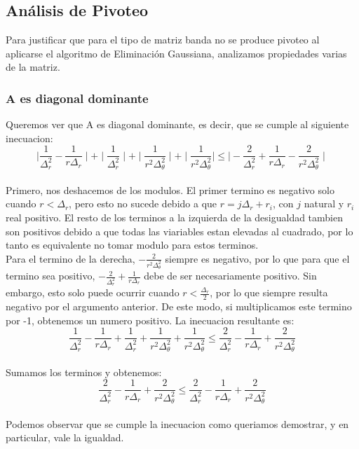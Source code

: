 \subsection{Análisis de Pivoteo}

Para justificar que para el tipo de matriz banda no se produce pivoteo al aplicarse el algoritmo de Eliminación Gaussiana, analizamos propiedades varias de la matriz.


\subsubsection{A es diagonal dominante}
Queremos ver que A es diagonal dominante, es decir, que se cumple al siguiente inecuacion:\\
$$\mid \frac{1}{\Delta^2_r}-\frac{1}{r \Delta_r}\mid +
\mid \frac{1}{\Delta^2_r} \mid + 
\mid \frac{1}{r^2 \Delta^2_\theta} \mid +
\mid \frac{1}{r^2 \Delta^2_\theta} \mid
\leq \mid -\frac{2}{\Delta^2_r}+\frac{1}{r \Delta_r}-\frac{2}{r^2 \Delta^2_\theta} \mid$$  \\
Primero, nos deshacemos de los modulos. El primer termino es negativo solo cuando $r < {\Delta_r}$, pero esto no sucede debido a que $r= j \Delta_r + r_i$, con $j$ natural y $r_i$ real positivo. El resto de los terminos a la izquierda de la desigualdad tambien son positivos debido a que todas las viariables estan elevadas al cuadrado, por lo tanto es equivalente no tomar modulo para estos terminos. \\
Para el termino de la derecha, $-\frac{2}{r^2 \Delta^2_\theta}$ siempre es negativo, por lo que para que el termino sea positivo, $-\frac{2}{\Delta^2_r}+\frac{1}{r \Delta_r}$ debe de ser necesariamente positivo. Sin embargo, esto solo puede ocurrir cuando $r < \frac{\Delta_r}{2}$, por lo que siempre resulta negativo por el argumento anterior. De este modo, si multiplicamos este termino por -1, obtenemos un numero positivo. La inecuacion resultante es: \\ 
$$ \frac{1}{\Delta^2_r}-\frac{1}{r \Delta_r} +  
\frac{1}{\Delta^2_r} + 
\frac{1}{r^2 \Delta^2_\theta} +
\frac{1}{r^2 \Delta^2_\theta}
\leq \frac{2}{\Delta^2_r}-\frac{1}{r \Delta_r}+\frac{2}{r^2 \Delta^2_\theta}$$ \\

Sumamos los terminos y obtenemos: \\
$$\frac{2}{\Delta^2_r}-\frac{1}{r \Delta_r}+\frac{2}{r^2 \Delta^2_\theta} \leq \frac{2}{\Delta^2_r}-\frac{1}{r \Delta_r}+\frac{2}{r^2 \Delta^2_\theta}$$ \\
Podemos observar que se cumple la inecuacion como queriamos demostrar, y en particular, vale la igualdad.

